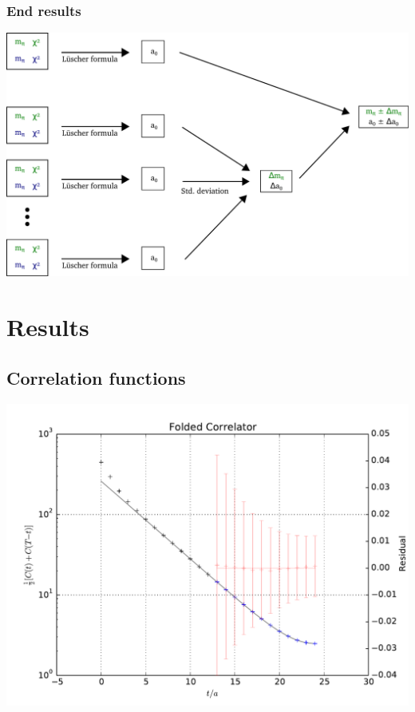 \documentclass[english, fleqn]{beamer}
\begin{document}
\begin{frame}
    \frametitle{End results}
    \begin{center}
        \includegraphics[scale=\scale]{sketches/08-end-result.pdf}
    \end{center}
\end{frame}


\section{Results}

\subsection*{Correlation functions}

\begin{frame}
    \begin{center}
        \includegraphics[height=\textheight]{plots/A100_24_L24_T48_beta190_mul0100_musig150_mudel190_kappa1632550__ev120__TB2_SO_LI6_new_c2_folded.pdf}
    \end{center}
\end{frame}
\end{document}
